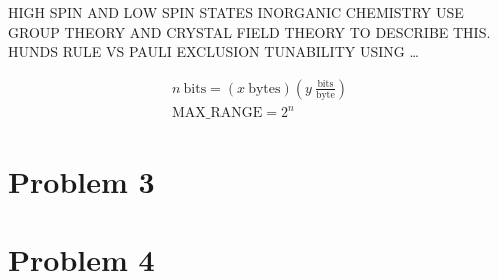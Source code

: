 \documentclass[12pt]{exam}
\begin{document}
                HIGH SPIN AND LOW SPIN STATES INORGANIC CHEMISTRY USE GROUP THEORY AND CRYSTAL FIELD THEORY TO DESCRIBE THIS. HUNDS RULE VS PAULI EXCLUSION TUNABILITY USING \ldots

            
            \begin{gather*}
                n \: \text{bits} = \left(x \: \text{bytes}\right) \left(y \: \frac{\text{bits}}{\text{byte}}\right) \\
                \text{MAX\_RANGE} = 2^{n}
            \end{gather*}

            

        
    \section*{\label{sec:prob3} Problem 3}

    \section*{\label{sec:prob4} Problem 4}
\end{document}
